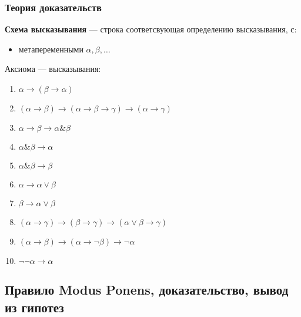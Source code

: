 \documentclass[english]{article}
\begin{document}
\subsubsection{Теория доказательств}
\label{sec:org3b47684}
\begin{definition}
	\textbf{Схема высказывания} --- строка соответсвующая определению высказывания, с:
	\begin{itemize}
		\item метапеременными \(\alpha, \beta, \dots\)
	\end{itemize}
\end{definition}
\begin{definition}
	Аксиома --- высказывания:
	\begin{enumerate}
		\item \(\alpha \to (\beta \to \alpha)\)
		\item \((\alpha \to \beta) \to (\alpha \to \beta \to \gamma) \to (\alpha \to \gamma)\)
		\item \(\alpha \to \beta \to \alpha \& \beta\)
		\item \(\alpha \& \beta \to \alpha\)
		\item \(\alpha \& \beta \to \beta\)
		\item \(\alpha \to \alpha \vee \beta\)
		\item \(\beta \to \alpha \vee \beta\)
		\item \((\alpha \to \gamma) \to (\beta \to \gamma) \to (\alpha \vee \beta \to \gamma)\)
		\item \((\alpha \to \beta) \to (\alpha \to \neg \beta) \to \neg \alpha\)
		\item \(\neg\neg \alpha \to \alpha\)
	\end{enumerate}
\end{definition}
\subsection{Правило Modus Ponens, доказательство, вывод из гипотез}
\label{sec:orgb81a163}
\end{document}
